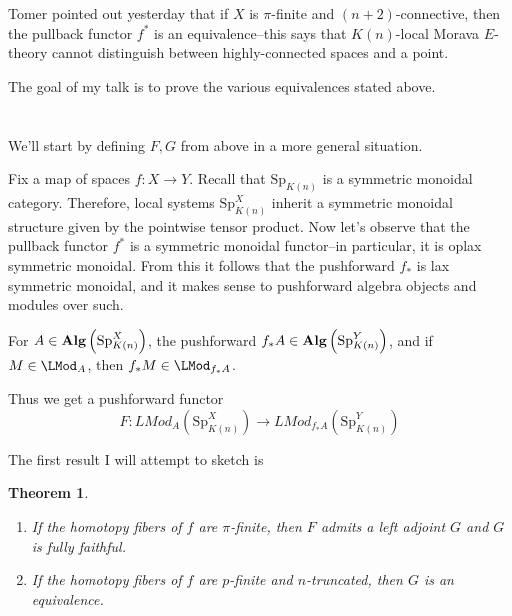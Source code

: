\documentclass{article}
\newcommand{\catname}[1]{{\normalfont\textbf{#1}}}
\newcommand{\Alg}{\catname{Alg}}
\newcommand{\Sp}{\text{Sp}}
\theoremstyle{definition} \newtheorem*{defn}{Definition}
\theoremstyle{plain} \newtheorem*{prop}{Proposition}
\theoremstyle{plain} \newtheorem*{lemma}{Lemma}
\theoremstyle{plain} \newtheorem*{cor}{Corollary}
\theoremstyle{remark} \newtheorem*{ex}{Example}
\theoremstyle{remark} \newtheorem*{exs}{Examples}
\theoremstyle{remark} \newtheorem*{nonex}{Non-example}
\theoremstyle{remark} \newtheorem*{rmk}{Remark}
\theoremstyle{remark} \newtheorem*{exc}{Exercise}
\theoremstyle{remark} \newtheorem*{idea}{Idea}
\theoremstyle{remark} \newtheorem*{obs}{Observation}
\theoremstyle{plain} \newtheorem*{theorem}{Theorem}
\theoremstyle{plain} \newtheorem*{conj}{Conjecture}
\theoremstyle{remark} \newtheorem*{q}{Question}
\theoremstyle{definition} \newtheorem*{fact}{Fact}
\theoremstyle{definition} \newtheorem*{facts}{Facts}
\theoremstyle{remark} \newtheorem*{ntn}{Notation}
\theoremstyle{remark} \newtheorem*{goal}{Goal}
\theoremstyle{remark} \newtheorem*{sketch}{Sketch}
\theoremstyle{definition} \newtheorem{claim}{Claim}
\begin{document}
Tomer pointed out yesterday that if $ X $ is $ \pi $-finite and $ (n+2) $-connective, then the pullback functor $ f^* $ is an equivalence--this says that $ K(n) $-local Morava $ E $-theory cannot distinguish between highly-connected spaces and a point. 

The goal of my talk is to prove the various equivalences stated above. 

\section{}
We'll start by defining $ F, G $ from above in a more general situation. 

Fix a map of spaces $ f:X \to Y $. 
Recall that $ \Sp_{K(n)} $ is a symmetric monoidal category. 
Therefore, local systems $ \Sp_{K(n)}^X $ inherit a symmetric monoidal structure given by the pointwise tensor product. 
Now let's observe that the pullback functor $ f^* $ is a symmetric monoidal functor--in particular, it is oplax symmetric monoidal. 
From this it follows that the pushforward $ f_* $ is lax symmetric monoidal, and it makes sense to pushforward algebra objects and modules over such. 

For $ A \in \Alg\left(\Sp_{K(n)}^X\right) $, the pushforward $ f_*A \in \Alg\left(\Sp_{K(n)}^Y\right) $, and if $ M \in \LMod_A $, then $ f_*M \in \LMod_{f_*A} $. 

Thus we get a pushforward functor 
\begin{equation*}
	F: LMod_A(\Sp^X_{K(n)}) \to LMod_{f_*A}(\Sp^Y_{K(n)})
\end{equation*}

The first result I will attempt to sketch is
\begin{theorem}\label{thm:adelathm1}
	\begin{enumerate}
		\item If the homotopy fibers of $ f $ are $ \pi $-finite, then $ F $ admits a left adjoint $ G $ and $ G $ is fully faithful. 

		\item If the homotopy fibers of $ f $ are $ p $-finite and $ n $-truncated, then $ G $ is an equivalence. 
	\end{enumerate}
\end{theorem}






\begin{comment}
\begin{equation}
\begin{tikzcd}
	& 
\end{tikzcd}
\end{equation}
\end{comment}
\end{document}
